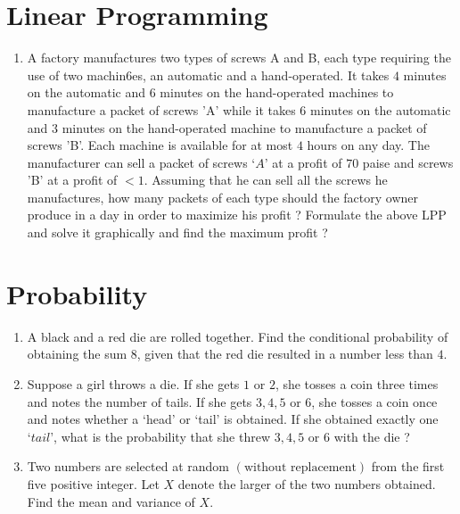 \documentclass{article}
\providecommand{\brak}[1]{\ensuremath{\left(#1\right)}}
\begin{document}
\section{Linear Programming}
\begin{enumerate}
\item A factory manufactures two types of screws A and B, each type requiring the use of two machin6es, an automatic and a hand-operated. It takes $4$ minutes on the automatic and $6$ minutes on the hand-operated machines to manufacture a packet of screws 'A' while it takes $6$ minutes on the automatic and $3$ minutes on the hand-operated machine to manufacture a packet of screws 'B'. Each machine is available for at most $4$ hours on any day. The manufacturer can sell a packet of screws $‘A’$ at a profit of $70$ paise and screws 'B' at a profit of $< 1$. Assuming that he can sell all the screws he manufactures, how many packets of each type should the factory owner produce in a day in order to maximize his profit ? Formulate the above LPP and solve it graphically and find the maximum profit ?
\end{enumerate}
\section{Probability}
\begin{enumerate}
\item A black and a red die are rolled together. Find the conditional probability of obtaining the sum $8$, given that the red die resulted in a number less than $4$.
\item Suppose a girl throws a die. If she gets $1$ or $2$, she tosses a coin three times and notes the number of tails. If she gets $3, 4, 5$ or $6$, she tosses a coin once and notes whether a ‘head’ or ‘tail’ is obtained. If she obtained exactly one $‘tail’$, what is the probability that she threw $3, 4, 5$ or $6$ with the die ?
\item Two numbers are selected at random \brak{\text{without replacement}} from the first five positive integer. Let $X$ denote the larger of the two numbers obtained. Find the mean and variance of $X$.
\end{enumerate}
\end{document}
